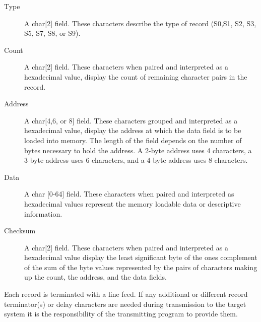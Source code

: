     \begin{description}
        \item[Type]
            A char[2] field. These characters describe the type of record (S0,S1, S2, S3, S5, S7, S8, or S9).

        \item[Count]
            A char[2] field. These characters when paired and interpreted as a hexadecimal value, display the count of remaining character pairs in the record.

        \item[Address]
            A char[4,6, or 8] field. These characters grouped and interpreted as a hexadecimal value, display the address at which the data field is to be loaded into memory. The length of the field depends on the number of bytes necessary to hold the address. A 2-byte address uses 4 characters, a 3-byte address uses 6 characters, and a 4-byte address uses 8 characters.

        \item[Data]
            A char [0-64] field. These characters when paired and interpreted as hexadecimal values represent the memory loadable data or descriptive information.

        \item[Checksum]
            A char[2] field. These characters when paired and interpreted as a hexadecimal value display the least significant byte of the ones complement of the sum of the byte values represented by the pairs of characters making up the count, the address, and the data fields.
    \end{description}

    Each record is terminated with a line feed. If any additional or different record terminator(s) or delay characters are needed during transmission to the target system it is the responsibility of the transmitting program to provide them.

